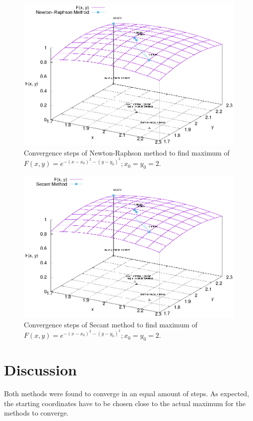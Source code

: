 \documentclass[11pt,a4paper]{article}
\begin{document}
\begin{figure}[ht]
\begin{center}
\includegraphics[scale=1.2]{figure1.eps} 
\end{center}
\caption{Convergence steps of Newton-Raphson method to find maximum of $F(x,y)=e^{-(x - x_0)^2 -(y -y_0)^2}; x_0=y_0=2$.}
\label{fig:1}
\end{figure}

\begin{figure}[ht]
\begin{center}
\includegraphics[scale=1.2]{figure2.eps} 
\end{center}
\caption{Convergence steps of Secant method to find maximum of $F(x,y)=e^{-(x - x_0)^2 -(y -y_0)^2}; x_0=y_0=2$.}
\label{fig:2}
\end{figure}

\section{Discussion}
Both methods were found to converge in an equal amount of steps. As expected, 
the starting coordinates have to be chosen close to the actual maximum for the methods
to converge.
\end{document}

